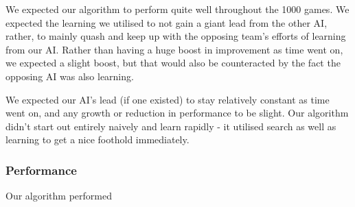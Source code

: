 \documentclass[11pt]{article}
\begin{document}
We expected our algorithm to perform quite well throughout the 1000 games. We expected the learning we utilised to not gain a giant lead from the other AI, rather, to mainly quash and keep up with the opposing team's efforts of learning from our AI. Rather than having a huge boost in improvement as time went on, we expected a slight boost, but that would also be counteracted by the fact the opposing AI was also learning.

We expected our AI's lead (if one existed) to stay relatively constant as time went on, and any growth or reduction in performance to be slight. Our algorithm didn't start out entirely naively and learn rapidly - it utilised search as well as learning to get a nice foothold immediately.
\subsubsection{Performance}
\label{sec-3-2-2}

Our algorithm performed
\end{document}
